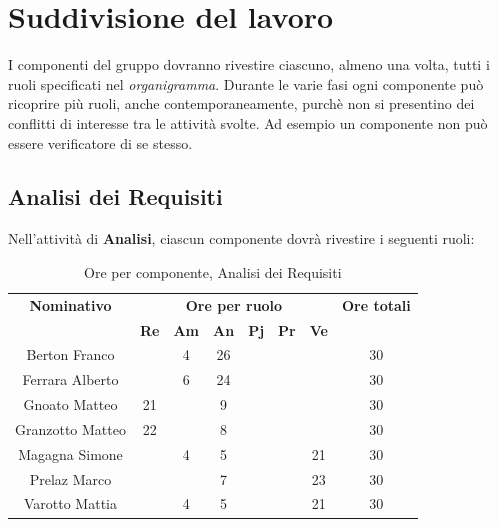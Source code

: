 \section{Suddivisione del lavoro}
I componenti del gruppo dovranno rivestire ciascuno, almeno una volta, tutti i ruoli specificati nel \textit{organigramma}.
Durante le varie fasi ogni componente può ricoprire più ruoli, anche contemporaneamente, purchè non si presentino dei conflitti di interesse tra le attività svolte. Ad esempio un componente non può essere verificatore di se stesso.
\subsection{Analisi dei Requisiti}
Nell'attività di \textbf{Analisi}, ciascun componente dovrà rivestire i seguenti ruoli:
\begin{table}[H]
	\begin{center}
		\begin{tabular}{|c|c|c|c|c|c|c|c|}
			\hline
			\textbf{Nominativo} & \multicolumn{6}{c|}{\textbf{Ore per ruolo}} & \textbf{Ore totali} \\
			& \textbf{Re} & \textbf{Am} & \textbf{An} & \textbf{Pj} & \textbf{Pr} & \textbf{Ve} & \\
			\hline
			Berton Franco		&		&	4	&	26	&		&		&		&	30	\\
			\hline
			Ferrara Alberto		&		&	6	&	24	&	 	&		&		& 	30	\\
			\hline
			Gnoato Matteo		&	21	&		&	9	&		&		&		&	30	\\
			\hline						
			Granzotto Matteo	&	22	&	 	&	8 	&		&	 	& 		&	30	\\
			\hline
			Magagna Simone 		&		&	4	&	5	&		&		& 	21	&	30	\\
			\hline
			Prelaz Marco 		& 		&		&	7	&		&		&	23	&	30	\\
			\hline						
			Varotto Mattia 		&		&	4	&	5	&		&		&	21	& 	30	\\
			\hline
		\end{tabular}
	\end{center}
	\caption{Ore per componente, Analisi dei Requisiti}
\end{table}

